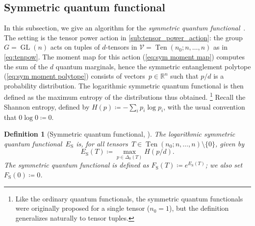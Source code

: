 \documentclass[11pt,letterpaper]{article}
\newtheorem{definition}[theorem]{Definition}\AddToHook{env/definition/begin}{\crefalias{theorem}{definition}}
\numberwithin{equation}{section}
\newcommand{\RR}{\mathbb{R}}
\newcommand{\VV}{\mathcal{V}}
\newcommand{\qfunc}{F}
\newcommand{\logqfunc}{E}
\DeclareMathOperator{\GL}{GL}
\DeclareMathOperator{\Sym}{S}
\DeclareMathOperator{\Ten}{Ten}
\begin{document}
\subsection{Symmetric quantum functional}\label{sub:symmetric_quantum}
In this subsection, we give an algorithm for the \emph{symmetric quantum functional}~\cite{CFTZ-22}.
The setting is the tensor power action in \cref{sub:tensor_power_action}:
the group $G = \GL(n)$ acts on tuples of $d$-tensors in $\VV = \Ten(n_0; n, \ldots, n)$ as in \cref{eq:tenpow}.
The moment map for this action (\cref{eq:sym moment map}) computes the sum of the $d$ quantum marginals, hence the symmetric entanglement polytope (\cref{eq:sym moment polytope}) consists of vectors~$p\in\RR^n$ such that $p/d$ is a probability distribution.
The logarithmic symmetric quantum functional is then defined as the maximum entropy of the distributions thus obtained.%
\footnote{Like the ordinary quantum functionals, the symmetric quantum functionals were originally proposed for a single tensor ($n_0 = 1$), but the definition generalizes naturally to tensor tuples.}
Recall the Shannon entropy, defined by $H(p)\coloneqq -\sum_ip_i \log p_i$, with the usual convention that $0\log0 \coloneqq 0$.

\begin{definition}[Symmetric quantum functional, \cite{CFTZ-22}]
The \emph{logarithmic symmetric quantum functional}~$\logqfunc_{\Sym}$ is, for all tensors~$T \in \Ten(n_0; n,\dots,n)\setminus\{0\}$, given by
\[
    \logqfunc_{\Sym}(T) \coloneqq \max_{p \in \Delta_{\Sym}(T)} H(p/d).
\]
The \emph{symmetric quantum functional} is defined as $\qfunc_{\Sym}(T) \coloneqq e^{\logqfunc_{\Sym}(T)}$; we also set %
$\qfunc_{\Sym}(0) \coloneqq 0$.
\end{definition}
\end{document}
